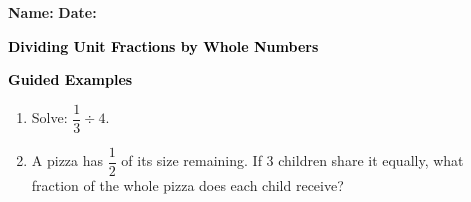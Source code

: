 \documentclass[12pt, letterpaper, fleqn]{article}
\begin{document}
\textbf{Name:} \underline{\hspace{5cm}}
\hfill
\textbf{Date:} \underline{\hspace{3cm}}\\

\begin{tcolorbox}[colback=customteal!20]
    \large\textcolor{black}{\textbf{Dividing Unit Fractions by Whole Numbers}}
\end{tcolorbox}
\newpage
\begin{tcolorbox}[colback=customteal!20]
    \large\textcolor{black}{\textbf{Guided Examples}}
\end{tcolorbox}
\begin{enumerate}[itemsep=3.5cm, leftmargin=0.6cm]
\item Solve: $\dfrac{1}{3} \div 4$.
\vspace{3cm}
\item A pizza has $\dfrac{1}{2}$ of its size remaining. If 3 children share it equally, what fraction of the whole pizza does each child receive?
\end{enumerate}
\end{document}
